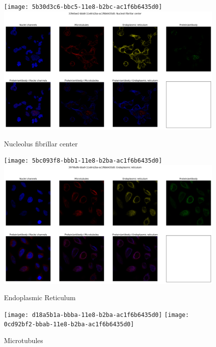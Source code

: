 \documentclass[]{article}
\begin{document}
\begin{figure}
	\caption{Nucleolus fibrillar center}
	\texttt{[image: 5b30d3c6-bbc5-11e8-b2bc-ac1f6b6435d0]}
	\includegraphics[width=\textwidth]{33fe0ae2-bbb8-11e8-b2ba-ac1f6b6435d0}
\end{figure}

\begin{figure}
	\caption{Endoplasmic Reticulum}\label{fig:er}
	\texttt{[image: 5bc093f8-bbb1-11e8-b2ba-ac1f6b6435d0]}
	\includegraphics[width=\textwidth]{3979bdfe-bba9-11e8-b2ba-ac1f6b6435d0}
\end{figure}

\begin{figure}
	\caption{Microtubules}\label{fig:mt}
	\texttt{[image: d18a5b1a-bbba-11e8-b2ba-ac1f6b6435d0]}
	\texttt{[image: 0cd92bf2-bbab-11e8-b2ba-ac1f6b6435d0]}
\end{figure}

\clearpage


\printacronyms
\printglossary



\end{document}
